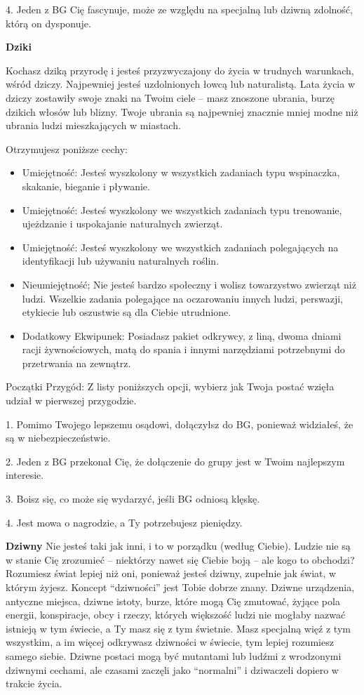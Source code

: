 4. Jeden z BG Cię fascynuje, może ze względu na specjalną lub dziwną zdolność, którą on dysponuje.


\textbf{Dziki}

Kochasz dziką przyrodę i jesteś przyzwyczajony do życia w trudnych warunkach, wśród dziczy. Najpewniej jesteś uzdolnionych łowcą lub naturalistą. Lata życia w dziczy zostawiły swoje znaki na Twoim ciele – masz znoszone ubrania, burzę dzikich włosów lub blizny. Twoje ubrania są najpewniej znacznie mniej modne niż ubrania ludzi mieszkających w miastach. 

Otrzymujesz poniższe cechy:
\begin{itemize}
 \item Umiejętność: Jesteś wyszkolony w wszystkich zadaniach typu wspinaczka, skakanie, bieganie i pływanie.
\item Umiejętność: Jesteś wyszkolony we wszystkich zadaniach typu trenowanie, ujeżdzanie i uspokajanie naturalnych zwierząt.
\item Umiejętność: Jesteś wyszkolony we wszystkich zadaniach polegających na identyfikacji lub używaniu naturalnych roślin.
\item Nieumiejętność; Nie jesteś bardzo społeczny i wolisz towarzystwo zwierząt niż ludzi. Wszelkie zadania polegające na oczarowaniu innych ludzi, perswazji, etykiecie lub oszustwie są dla Ciebie utrudnione.
\item Dodatkowy Ekwipunek: Posiadasz pakiet odkrywcy, z liną, dwoma dniami racji żywnościowych, matą do spania i innymi narzędziami potrzebnymi do przetrwania na zewnątrz.
\end{itemize}    
    
Początki Przygód: Z listy poniższych opcji, wybierz jak Twoja postać wzięła udział w pierwszej przygodzie.

1. Pomimo Twojego lepszemu osądowi, dołączyłsz do BG, ponieważ widziałeś, że są w niebezpieczeństwie.

2. Jeden z BG przekonał Cię, że dołączenie do grupy jest w Twoim najlepszym interesie.

3. Boisz się, co może się wydarzyć, jeśli BG odniosą klęskę.

4. Jest mowa o nagrodzie, a Ty potrzebujesz pieniędzy.

\textbf{Dziwny}
Nie jesteś taki jak inni, i to w porządku (według Ciebie). Ludzie nie są w stanie Cię zrozumieć – niektórzy nawet się Ciebie boją – ale kogo to obchodzi? Rozumiesz świat lepiej niż oni, ponieważ jesteś dziwny, zupełnie jak świat, w którym żyjesz. Koncept “dziwności” jest Tobie dobrze znany. Dziwne urządzenia, antyczne miejsca, dziwne istoty, burze, które mogą Cię zmutować, żyjące pola energii, konspiracje, obcy i rzeczy, których większość ludzi nie mogłaby nazwać istnieją w tym świecie, a Ty masz się z tym świetnie. Masz specjalną więź z tym wszystkim, a im więcej odkrywasz dziwności w świecie, tym lepiej rozumiesz samego siebie. Dziwne postaci mogą być mutantami lub ludźmi z wrodzonymi dziwnymi cechami, ale czasami zaczęli jako “normalni” i dziwaczeli dopiero w trakcie życia.

